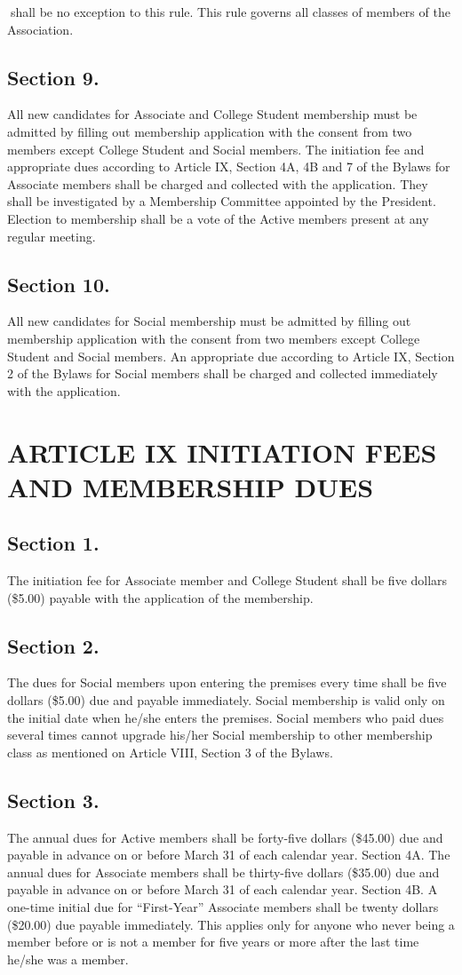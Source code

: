 \documentclass[12pt,letterpaper]{article}
\begin{document}
shall be no exception to this rule. This rule governs all classes of members of the
Association.
\subsection*{Section 9.} All new candidates for Associate and College Student membership must be
admitted by filling out membership application with the consent from two members
except College Student and Social members. The initiation fee and appropriate dues
according to Article IX, Section 4A, 4B and 7 of the Bylaws for Associate members shall
be charged and collected with the application. They shall be investigated by a
Membership Committee appointed by the President. Election to membership shall be a
vote of the Active members present at any regular meeting.
\subsection*{Section 10.} All new candidates for Social membership must be admitted by filling out
membership application with the consent from two members except College Student and
Social members. An appropriate due according to Article IX, Section 2 of the Bylaws for
Social members shall be charged and collected immediately with the application.

\section*{ARTICLE IX
INITIATION FEES AND MEMBERSHIP DUES}

\subsection*{Section 1.} The initiation fee for Associate member and College Student shall be five
dollars (\$5.00) payable with the application of the membership.
\subsection*{Section 2.} The dues for Social members upon entering the premises every time shall be
five dollars (\$5.00) due and payable immediately. Social membership is valid only on
the initial date when he/she enters the premises. Social members who paid dues several
times cannot upgrade his/her Social membership to other membership class as
mentioned on Article VIII, Section 3 of the Bylaws.
\subsection*{Section 3.} The annual dues for Active members shall be forty-five dollars (\$45.00) due
and payable in advance on or before March 31 of each calendar year.
Section 4A.
The annual dues for Associate members shall be thirty-five dollars
(\$35.00) due and payable in advance on or before March 31 of each calendar year.
Section 4B.
A one-time initial due for “First-Year” Associate members shall be
twenty dollars (\$20.00) due payable immediately. This applies only for anyone who
never being a member before or is not a member for five years or more after the last
time he/she was a member.
\end{document}

